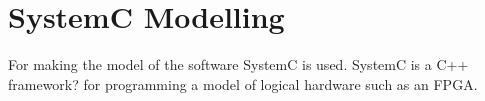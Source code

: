 \section{SystemC Modelling}

For making the model of the software SystemC is used. SystemC is a C++ framework? for programming a model of logical hardware such as an FPGA. 

